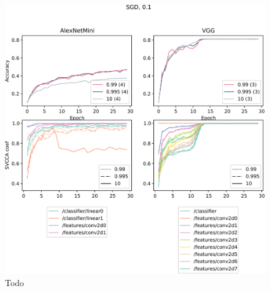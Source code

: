 \begin{figure}
    \centering
    \includegraphics[width=\linewidth]{gfx/diagrams/experiments/saturation/alexnetmini_vgg_sgd_01.pdf}
    \caption{Todo}
    \label{fig:saturation_alexnet_vgg_sgd_01}
\end{figure}
